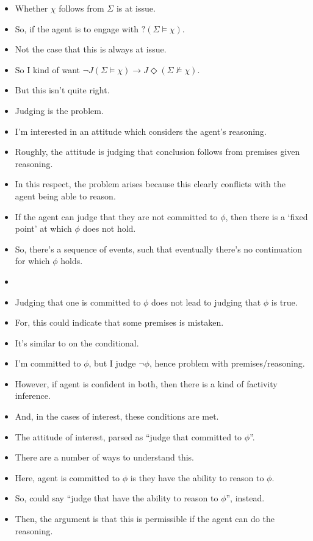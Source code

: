 \documentclass[10pt]{article}
\begin{document}
\begin{itemize}
\item Whether \(\chi\) follows from \(\Sigma\) is at issue.
\item So, if the agent is to engage with \(?(\Sigma \vDash \chi)\).
\item Not the case that this is always at issue.
\item So I kind of want \(\lnot J (\Sigma \vDash \chi) \rightarrow J\Diamond (\Sigma \nvDash \chi)\).
\item But this isn't quite right.
\item Judging is the problem.
\item I'm interested in an attitude which considers the agent's reasoning.
\item Roughly, the attitude is judging that conclusion follows from premises given reasoning.
\item In this respect, the problem arises because this clearly conflicts with the agent being able to reason.
\end{itemize}

\begin{itemize}
\item If the agent can judge that they are not committed to \(\phi\), then there is a `fixed point' at which \(\phi\) does not hold.
\item So, there's a sequence of events, such that eventually there's no continuation for which \(\phi\) holds.
\item 
\end{itemize}


\begin{itemize}
\item Judging that one is committed to \(\phi\) does not lead to judging that \(\phi\) is true.
\item For, this could indicate that some premises is mistaken.
\item It's similar to \citeauthor{Harman:1986aa} on the conditional.
\item I'm committed to \(\phi\), but I judge \(\lnot\phi\), hence problem with premises/reasoning.
\item However, if agent is confident in both, then there is a kind of factivity inference.
\item And, in the cases of interest, these conditions are met.
\end{itemize}

\begin{itemize}
\item The attitude of interest, parsed as ``judge that committed to \(\phi\)''.
\item There are a number of ways to understand this.
\item Here, agent is committed to \(\phi\) is they have the ability to reason to \(\phi\).
\item So, could say ``judge that have the ability to reason to \(\phi\)'', instead.
\item Then, the argument is that this is permissible if the agent can do the reasoning.
\end{itemize}
\end{document}
